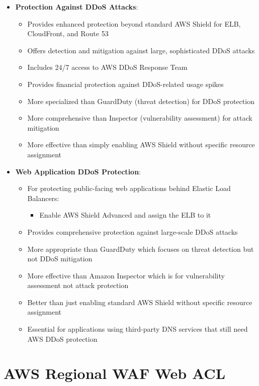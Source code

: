 \documentclass[11pt,a4paper]{report}
\begin{document}
\begin{itemize}
\begin{itemize}
  \item More appropriate than Spot Instance scaling which doesn't address the attack vector directly
\end{itemize}
  \item \textbf{Protection Against DDoS Attacks}:
\begin{itemize}
  \item Provides enhanced protection beyond standard AWS Shield for ELB, CloudFront, and Route 53
  \item Offers detection and mitigation against large, sophisticated DDoS attacks
  \item Includes 24/7 access to AWS DDoS Response Team
  \item Provides financial protection against DDoS-related usage spikes
  \item More specialized than GuardDuty (threat detection) for DDoS protection
  \item More comprehensive than Inspector (vulnerability assessment) for attack mitigation
  \item More effective than simply enabling AWS Shield without specific resource assignment
\end{itemize}
  \item \textbf{Web Application DDoS Protection}:
\begin{itemize}
  \item For protecting public-facing web applications behind Elastic Load Balancers:
\begin{itemize}
  \item Enable AWS Shield Advanced and assign the ELB to it
\end{itemize}
  \item Provides comprehensive protection against large-scale DDoS attacks
  \item More appropriate than GuardDuty which focuses on threat detection but not DDoS mitigation
  \item More effective than Amazon Inspector which is for vulnerability assessment not attack protection
  \item Better than just enabling standard AWS Shield without specific resource assignment
  \item Essential for applications using third-party DNS services that still need AWS DDoS protection
\end{itemize}
\end{itemize}


\section{AWS Regional WAF Web ACL}
\end{document}
